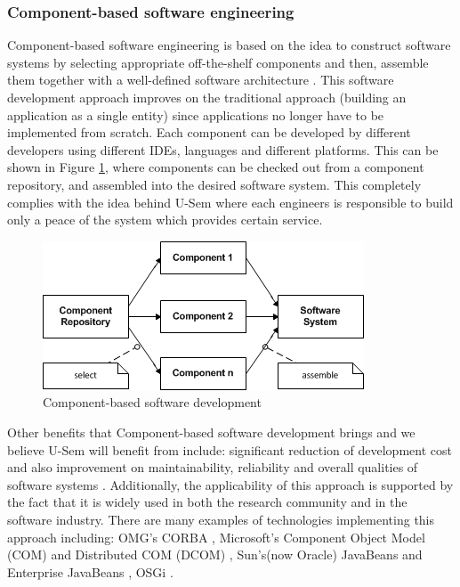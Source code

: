 \subsubsection{Component-based software engineering}

Component-based software engineering is based on the idea to construct software systems by selecting appropriate off-the-shelf components and then, assemble them together with a well-defined software architecture \cite{pour1998component}. This software development approach improves on the traditional approach (building an application as a single entity) since applications no longer have to be implemented from scratch. Each component can be developed by different developers using different IDEs, languages and different platforms. This can be shown in Figure \ref{fig_cbsd}, where components can be checked out from a component repository, and assembled into the desired software system. This completely complies with the idea behind U-Sem where each engineers is responsible to build only a peace of the system which provides certain service.

\begin{figure}[h!]
  \centering
  	\includegraphics[scale=0.75]{plug-in/component-based.png}
  \caption{Component-based software development \cite{pour1998component} }
  \label{fig_cbsd}
\end{figure}

Other benefits that Component-based software development brings and we believe U-Sem will benefit from include: significant reduction of development cost and also improvement on maintainability, reliability and overall qualities of software systems \cite{pour1999enterprise} \cite{pour1999making}. Additionally, the applicability of this approach is supported by the fact that it is widely used in both the research community and in the software industry. There are many examples of technologies implementing this approach including: OMG's CORBA \cite{vinoski1997corba},  Microsoft's Component Object Model (COM) and Distributed COM (DCOM) \cite{sessions1997and}, Sun's(now Oracle) JavaBeans and Enterprise JavaBeans \cite{goncalves2010enterprise}, OSGi \cite{tavares2008gentle}.


